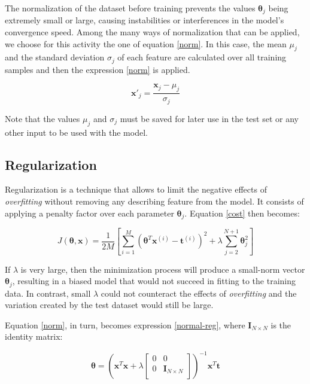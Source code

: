 \documentclass[10pt,twocolumn,letterpaper]{article}
\begin{document}
The normalization of the dataset before training prevents the values \(\bm{\theta}_j \) being extremely small or large, causing instabilities or interferences in the model's convergence speed. Among the many ways of normalization that can be applied, we choose for this activity the one of equation \ref {norm}. In this case, the mean \(\mu_j\) and the standard deviation \(\sigma_j\) of each feature are calculated over all training samples and then the expression \ref {norm} is applied.

\begin {equation}
\label {norm}
\bm {x'}_j = \frac {\bm{x}_j - \mu_j}{\sigma_j}
\end{equation}

Note that the values \(\mu_j\) and \(\sigma_j\) must be saved for later use in the test set or any other input to be used with the model.

\subsection{Regularization}

\label{sec:reg}

Regularization is a technique that allows to limit the negative effects of \textit{overfitting} without removing any describing feature from the model. It consists of applying a penalty factor over each parameter \(\bm{\theta}_j \). Equation \ref{cost} then becomes:

\begin{equation}
\label {cost-reg}
J(\bm{\theta}, \bm{x}) = \frac{1}{2M} \left[\displaystyle\sum_{i=1}^{M} \left(\bm{\theta}^T\bm{x}^{(i)} - \bm{t}^{(i)}\right)^2 + \lambda \displaystyle\sum_{j=2}^{N + 1} \bm{\theta}_j^2 \right]
\end{equation}

If \(\lambda\) is very large, then the minimization process will produce a small-norm vector \(\bm{\theta}_j\), resulting in a biased model that would not succeed in fitting to the training data. In contrast, small \(\lambda\) could not counteract the effects of \textit {overfitting} and the variation created by the test dataset would still be large.

Equation \ref {norm}, in turn, becomes expression \ref{normal-reg}, where \(\bm{I}_{N \times N}\) is the identity matrix:

\begin{equation}
\label {normal-reg}
\bm{\theta} = \left(\bm{x}^T\bm{x} + \lambda
\begin{bmatrix}
    0       & 0 \\
    0       & \bm{I}_{N \times N} \\
\end{bmatrix}
\right)^{-1} \bm{x}^T \bm{t}
\end{equation}
\end{document}
